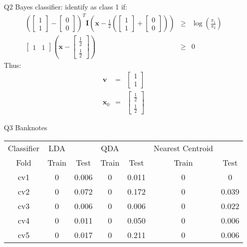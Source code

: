 \documentclass{article}
\begin{document}
\begin{itemize}
\item[Q2]
Bayes classifier: identify as class 1 if:
\begin{eqnarray*}
\left(\begin{bmatrix}1 \\ 1 \end{bmatrix} - \begin{bmatrix} 0 \\ 0 \end{bmatrix}\right)^T
\mathbf{I} \left(\mathbf{x} - \frac{1}{2}\left(\begin{bmatrix}1 \\ 1 \end{bmatrix} + \begin{bmatrix} 0 \\ 0 \end{bmatrix}\right)\right) & \ge & \log\left(\frac{\pi_1}{\pi_2}\right) \\
\begin{bmatrix}
1 & 1
\end{bmatrix}\left(\mathbf{x} - \begin{bmatrix}
\frac{1}{2} \\ \frac{1}{2}
\end{bmatrix}\right) & \ge & 0
\end{eqnarray*}
Thus:
\begin{eqnarray*}
\mathbf{v} & = & \begin{bmatrix} 1 \\ 1 \end{bmatrix} \\
\mathbf{x}_0 & = & \begin{bmatrix} \frac{1}{2} \\ \frac{1}{2} \end{bmatrix} 
\end{eqnarray*}
\item[Q3]
Banknotes
\newline
\begin{tabular}{c | c c | c c | c c |}
Classifier & LDA && QDA && Nearest Centroid  & \\
Fold & Train & Test & Train & Test & Train & Test \\
\hline
cv1 & 0 & 0.006 & 0 & 0.011 & 0 & 0 \\
cv2 & 0 & 0.072 & 0 & 0.172 & 0 & 0.039 \\
cv3 & 0 & 0.006 & 0 & 0.006 & 0 & 0.022 \\
cv4 & 0 & 0.011 & 0 & 0.050 & 0 & 0.006 \\
cv5 & 0 & 0.017 & 0 & 0.211 & 0 & 0.006 \\

\end{tabular}
\end{itemize}
\end{document}
